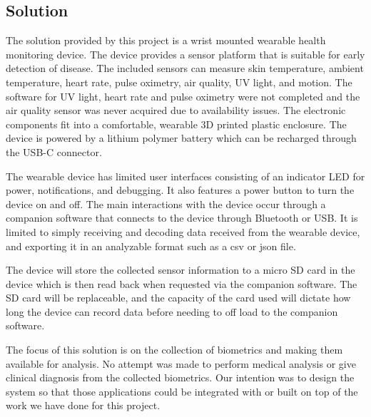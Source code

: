 \subsection{Solution}

The solution provided by this project is a wrist mounted wearable health 
monitoring device. The device provides a sensor platform that is suitable for 
early detection of disease. The included sensors can measure skin temperature, 
ambient temperature, heart rate, pulse oximetry, air quality, UV light, and motion.  
The software for UV light, heart rate and pulse oximetry were not completed and
the air quality sensor was never acquired due to availability issues. The electronic
components fit into a comfortable, wearable 3D printed plastic enclosure.
The device is powered by a lithium polymer battery which can be recharged
through the USB-C connector.

The wearable device has limited user interfaces consisting of an indicator
LED for power, notifications, and debugging. It also features a power button
to turn the device on and off. The main interactions with the device occur 
through a companion software that connects to the device through Bluetooth or 
USB. It is limited to simply receiving and decoding data received from the 
wearable device, and exporting it in an analyzable format such as a csv or json 
file.

The device will store the collected sensor information to a micro SD card
in the device which is then read back when requested via the companion software.
The SD card will be replaceable, and the capacity of the card used will dictate
how long the device can record data before needing to off load to the companion
software.

The focus of this solution is on the collection of biometrics and making them
available for analysis. No attempt was made to perform medical analysis
or give clinical diagnosis from the collected biometrics. Our intention was to
design the system so that those applications could be integrated with or built
on top of the work we have done for this project.



